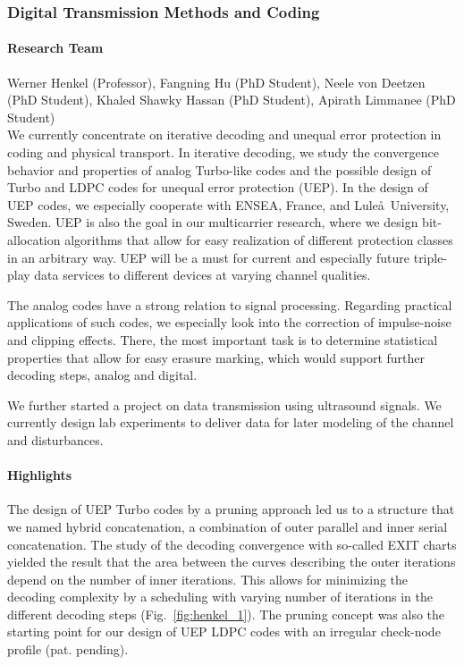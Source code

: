 \subsubsection{Digital Transmission Methods and Coding}
\label{ict:cns:henkel} 

\paragraph{Research Team}
Werner Henkel (Professor), Fangning Hu (PhD Student), Neele von Deetzen (PhD
Student), Khaled Shawky Hassan (PhD Student), Apirath Limmanee (PhD Student)\\

We currently concentrate on iterative decoding and unequal error protection in
coding and physical transport. In iterative decoding, we study the convergence
behavior and properties of analog Turbo-like codes and the possible design of
Turbo and LDPC codes for unequal error protection (UEP). In the design of UEP
codes, we especially cooperate with ENSEA, France, and Lule\aa\ University,
Sweden. UEP is also the goal in our multicarrier research, where we design
bit-allocation algorithms that allow for easy realization of different
protection classes in an arbitrary way. UEP will be a must for current and
especially future triple-play data services to different devices at varying
channel qualities.

The analog codes have a strong relation to signal processing. Regarding
practical applications of such codes, we especially look into the correction
of impulse-noise and clipping effects. There, the most important task is to
determine statistical properties that allow for easy erasure marking, which
would support further decoding steps, analog and digital.

We further started a project on data transmission using ultrasound signals. We
currently design lab experiments to deliver data for later modeling of the
channel and disturbances.


\paragraph{Highlights}

The design of UEP Turbo codes by a pruning approach led us to a
structure that we named hybrid concatenation, a combination of outer
parallel and inner serial concatenation. The study of the decoding
convergence with so-called EXIT charts yielded the result that the
area between the curves describing the outer iterations depend on
the number of inner iterations. This allows for minimizing the
decoding complexity by a scheduling with varying number of
iterations in the different decoding steps
(Fig.~\ref{fig:henkel_1}). The pruning concept was also the starting
point for our design of UEP LDPC codes with an irregular check-node
profile (pat. pending).

